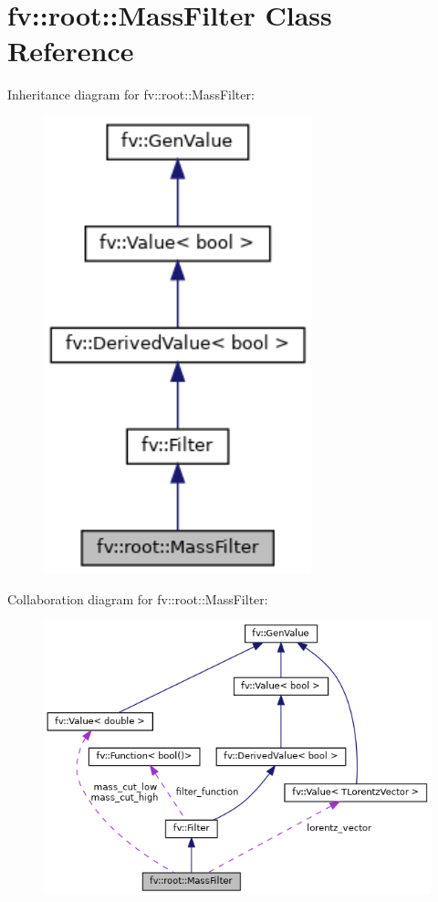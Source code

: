 \hypertarget{classfv_1_1root_1_1MassFilter}{}\section{fv\+:\+:root\+:\+:Mass\+Filter Class Reference}
\label{classfv_1_1root_1_1MassFilter}


Inheritance diagram for fv\+:\+:root\+:\+:Mass\+Filter\+:
\nopagebreak
\begin{figure}[H]
\begin{center}
\leavevmode
\includegraphics[width=220pt]{classfv_1_1root_1_1MassFilter__inherit__graph}
\end{center}
\end{figure}


Collaboration diagram for fv\+:\+:root\+:\+:Mass\+Filter\+:
\nopagebreak
\begin{figure}[H]
\begin{center}
\leavevmode
\includegraphics[width=350pt]{classfv_1_1root_1_1MassFilter__coll__graph}
\end{center}
\end{figure}
